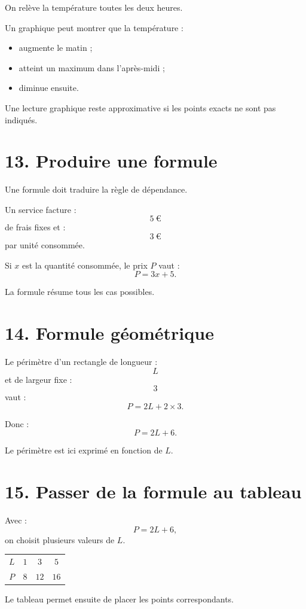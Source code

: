 On relève la température toutes les deux heures.

Un graphique peut montrer que la température :
\begin{itemize}
\item augmente le matin ;
\item atteint un maximum dans l'après-midi ;
\item diminue ensuite.
\end{itemize}

Une lecture graphique reste approximative si les points exacts ne sont pas indiqués.

\section{13. Produire une formule}

Une formule doit traduire la règle de dépendance.

\begin{exemple}
Un service facture :
\[
5\ \text{€}
\]
de frais fixes et :
\[
3\ \text{€}
\]
par unité consommée.

Si $x$ est la quantité consommée, le prix $P$ vaut :
\[
\boxed{P=3x+5}.
\]
\end{exemple}

La formule résume tous les cas possibles.

\section{14. Formule géométrique}

Le périmètre d'un rectangle de longueur :
\[
L
\]
et de largeur fixe :
\[
3
\]
vaut :
\[
P=2L+2\times3.
\]

Donc :
\[
\boxed{P=2L+6}.
\]

Le périmètre est ici exprimé en fonction de $L$.

\section{15. Passer de la formule au tableau}

Avec :
\[
P=2L+6,
\]
on choisit plusieurs valeurs de $L$.

\begin{tabular}{c|c|c|c}
$L$ & $1$ & $3$ & $5$ \\
$P$ & $8$ & $12$ & $16$ \\
\end{tabular}

Le tableau permet ensuite de placer les points correspondants.

